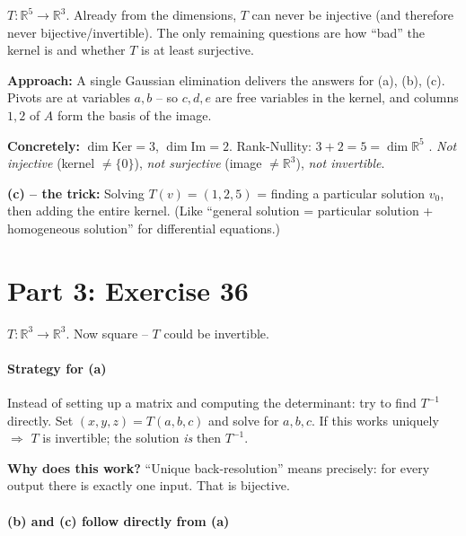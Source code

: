 \documentclass[a4paper,12pt]{article}
\begin{document}
$T \colon \mathbb{R}^5 \to \mathbb{R}^3$. Already from the dimensions, $T$ can never be injective (and therefore never bijective/invertible). The only remaining questions are how ``bad'' the kernel is and whether $T$ is at least surjective.

\medskip

\textbf{Approach:} A single Gaussian elimination delivers the answers for (a), (b), (c). Pivots are at variables $a, b$ -- so $c, d, e$ are free variables in the kernel, and columns $1, 2$ of $A$ form the basis of the image.

\medskip

\textbf{Concretely:} $\dim \text{Ker} = 3$, $\dim \text{Im} = 2$. Rank-Nullity: $3 + 2 = 5 = \dim \mathbb{R}^5$ \checkmark. \emph{Not injective} (kernel $\neq \{0\}$), \emph{not surjective} (image $\neq \mathbb{R}^3$), \emph{not invertible}.

\medskip

\textbf{(c) -- the trick:} Solving $T(v) = (1, 2, 5)$ = finding a particular solution $v_0$, then adding the entire kernel. (Like ``general solution = particular solution + homogeneous solution'' for differential equations.)

\newpage

\part*{Part 3: Exercise 36}

$T \colon \mathbb{R}^3 \to \mathbb{R}^3$. Now square -- $T$ could be invertible.

\subsection*{Strategy for (a)}

Instead of setting up a matrix and computing the determinant: try to find $T^{-1}$ directly. Set $(x, y, z) = T(a, b, c)$ and solve for $a, b, c$. If this works uniquely $\Rightarrow$ $T$ is invertible; the solution \emph{is} then $T^{-1}$.

\textbf{Why does this work?} ``Unique back-resolution'' means precisely: for every output there is exactly one input. That is bijective.

\subsection*{(b) and (c) follow directly from (a)}
\end{document}
